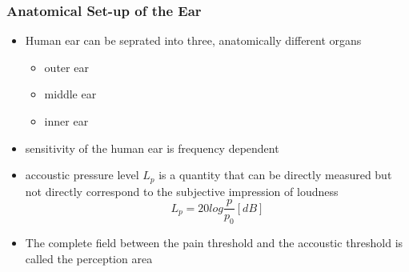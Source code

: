 \documentclass{standalone}
\begin{document}
\subsubsection{Anatomical Set-up of the Ear}
\begin{itemize}
	\item Human ear can be seprated into three, anatomically different organs
		\begin{itemize}
			\item outer ear
			\item middle ear
			\item inner ear
		\end{itemize}
	\item sensitivity of the human ear is frequency dependent
	\item accoustic pressure level $L_p$ is a quantity that can be directly measured but not directly correspond to the subjective impression of loudness
	\begin{equation}
	L_p = 20 log \frac{p}{p_0} [dB]
	\end{equation}
	\item The complete field between the pain threshold and the accoustic threshold is called the perception area
\end{itemize}
\end{document}

